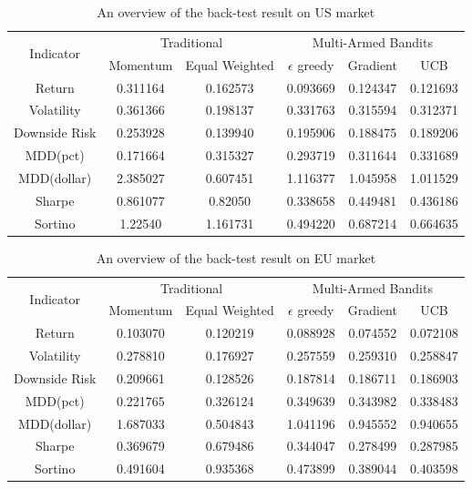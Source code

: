 \documentclass{article}
\begin{document}
\begin{table}[H]
\caption{An overview of the back-test result on US market}
\centering
\begin{tabular}{|c | c | c | c | c | c | }
\hline
\multirow{2}{*}{Indicator} & \multicolumn{2}{c|}{Traditional}&\multicolumn{3}{c|}{Multi-Armed Bandits}  \\ \cline{2-6}
& Momentum & Equal Weighted & $\epsilon$ greedy & Gradient & UCB  \\ \hline  
Return & 0.311164 & 0.162573 & 0.093669 & 0.124347 & 0.121693  \\ \hline
Volatility & 0.361366 & 0.198137 & 0.331763 & 0.315594 & 0.312371  \\ \hline
Downside Risk & 0.253928 & 0.139940 & 0.195906 & 0.188475 & 0.189206  \\ \hline
MDD(pct) & 0.171664 & 0.315327 & 0.293719 & 0.311644 & 0.331689  \\ \hline
MDD(dollar) & 2.385027 & 0.607451 & 1.116377 & 1.045958 & 1.011529  \\ \hline
Sharpe & 0.861077 & 0.82050 & 0.338658 & 0.449481 & 0.436186  \\ \hline
Sortino & 1.22540 & 1.161731 & 0.494220 & 0.687214 & 0.664635  \\ \hline
\end{tabular}
\end{table}
\begin{table}[H]
\caption{An overview of the back-test result on EU market}

\centering
\begin{tabular}{|c | c | c | c | c | c | }
\hline
\multirow{2}{*}{Indicator} & \multicolumn{2}{c|}{Traditional}&\multicolumn{3}{c|}{Multi-Armed Bandits}  \\ \cline{2-6}
& Momentum & Equal Weighted & $\epsilon$ greedy & Gradient & UCB  \\ \hline  
Return & 0.103070 & 0.120219 &  0.088928 & 0.074552 & 0.072108  \\ \hline
Volatility & 0.278810 & 0.176927 & 0.257559 & 0.259310 & 0.258847  \\ \hline
Downside Risk & 0.209661 & 0.128526 & 0.187814 & 0.186711 & 0.186903  \\ \hline
MDD(pct) & 0.221765 & 0.326124 & 0.349639 & 0.343982 & 0.338483  \\ \hline
MDD(dollar) & 1.687033 & 0.504843 & 1.041196 & 0.945552 & 0.940655  \\ \hline
Sharpe & 0.369679 & 0.679486 & 0.344047 & 0.278499 & 0.287985  \\ \hline
Sortino & 0.491604 & 0.935368 & 0.473899 & 0.389044 & 0.403598  \\ \hline
\end{tabular}
\end{table}
\end{document}
